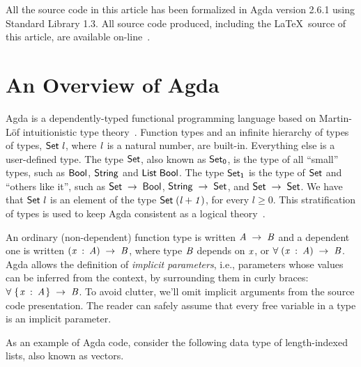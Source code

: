 \documentclass[sigconf]{acmart}
\theoremstyle{definition}
\renewcommand{\geq}{\geqslant}
\newcommand{\D}[1]{\blue{\mathsf{#1}}}
\newcommand{\V}[1]{\purple{\mathit{#1}}}
\begin{document}
All the source code in this article has been formalized in Agda
version 2.6.1 using Standard Library 1.3. All source code produced,
including the \LaTeX~source of this article, are available
on-line~\cite{list-rep}.


\section{An Overview of Agda}\label{sec:agda}


Agda is a dependently-typed functional programming language based on
Martin-L\"of intuitionistic type theory~\cite{Lof98}.  Function types
and an infinite hierarchy of types of types, \ensuremath{\D{Set}\;\V{l}}, where \ensuremath{\V{l}} is a
natural number, are built-in. Everything else is a user-defined
type. The type \ensuremath{\D{Set}}, also known as \ensuremath{\D{Set}_{\D{0}}}, is the type of all
``small'' types, such as \ensuremath{\D{Bool}}, \ensuremath{\D{String}} and \ensuremath{\D{List}\;\D{Bool}}.  The type
\ensuremath{\D{Set}_{\D{1}}} is the type of \ensuremath{\D{Set}} and ``others like it'', such as \ensuremath{\D{Set}\;\to \;\D{Bool}}, \ensuremath{\D{String}\;\to \;\D{Set}}, and \ensuremath{\D{Set}\;\to \;\D{Set}}. We have that \ensuremath{\D{Set}\;\V{l}} is an
element of the type \ensuremath{\D{Set}\;(\V{l+1})}, for every $l \geq 0$. This
stratification of types is used to keep Agda consistent as a logical
theory~\cite{Sorensen2006}.

An ordinary (non-dependent) function type is written \ensuremath{\V{A}\;\to \;\V{B}} and a
dependent one is written \ensuremath{(\V{x}\;\mathbin{:}\;\V{A})\;\to \;\V{B}}, where type \ensuremath{\V{B}} depends on
\ensuremath{\V{x}}, or \ensuremath{\D{\forall}\;(\V{x}\;\mathbin{:}\;\V{A})\;\to \;\V{B}}. Agda allows the definition of \emph{implicit
parameters}, i.e.,  parameters whose values can be inferred from the
context, by surrounding them in curly braces: \ensuremath{\D{\forall}\;\{\mskip1.5mu \V{x}\;\mathbin{:}\;\V{A}\mskip1.5mu\}\;\to \;\V{B}}. To
avoid clutter, we'll omit implicit arguments from the source code
presentation. The reader can safely assume that every free variable in
a type is an implicit parameter.

As an example of Agda code, consider the following data type of
length-indexed lists, also known as vectors.
\end{document}

